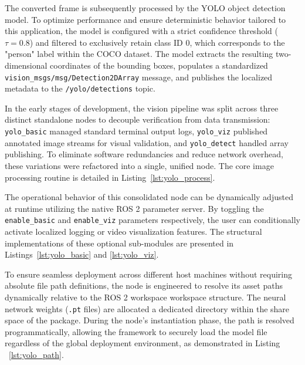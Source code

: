 The converted frame is subsequently processed by the YOLO object detection model. To optimize performance and ensure deterministic behavior tailored to this application, the model is configured with a strict confidence threshold ($\tau = 0.8$) and filtered to exclusively retain class ID $0$, which corresponds to the "person" label within the COCO dataset. The model extracts the resulting two-dimensional coordinates of the bounding boxes, populates a standardized \texttt{vision\_msgs/msg/Detection2DArray} message, and publishes the localized metadata to the \texttt{/yolo/detections} topic.

In the early stages of development, the vision pipeline was split across three distinct standalone nodes to decouple verification from data transmission: \texttt{yolo\_basic} managed standard terminal output logs, \texttt{yolo\_viz} published annotated image streams for visual validation, and \texttt{yolo\_detect} handled array publishing. To eliminate software redundancies and reduce network overhead, these variations were refactored into a single, unified node. The core image processing routine is detailed in Listing~\ref{lst:yolo_process}.



The operational behavior of this consolidated node can be dynamically adjusted at runtime utilizing the native ROS 2 parameter server. By toggling the \texttt{enable\_basic} and \texttt{enable\_viz} parameters respectively, the user can conditionally activate localized logging or video visualization features. The structural implementations of these optional sub-modules are presented in Listings~\ref{lst:yolo_basic} and \ref{lst:yolo_viz}.

\newpage





To ensure seamless deployment across different host machines without requiring absolute file path definitions, the node is engineered to resolve its asset paths dynamically relative to the ROS 2 workspace workspace structure. The neural network weights (\texttt{.pt} files) are allocated a dedicated directory within the share space of the package. During the node's instantiation phase, the path is resolved programmatically, allowing the framework to securely load the model file regardless of the global deployment environment, as demonstrated in Listing ~\ref{lst:yolo_path}.

